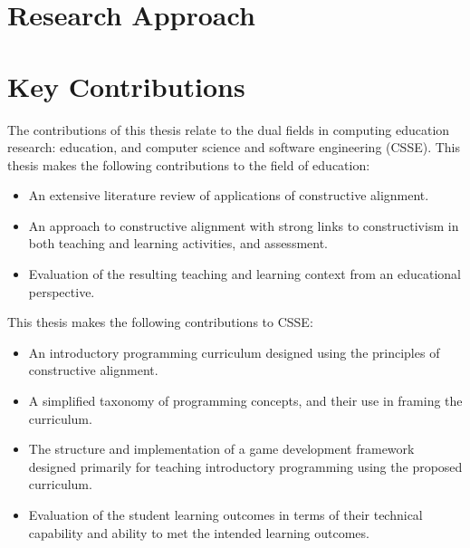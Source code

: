 

\section{Research Approach} %
\label{sec:research_approach}



\clearpage
\section{Key Contributions} %
\label{sec:key_contributions}



The contributions of this thesis relate to the dual fields in computing education research: education, and computer science and software engineering (CSSE). This thesis makes the following contributions to the field of education:
\begin{itemize}
	\item An extensive literature review of applications of constructive alignment.
	\item An approach to constructive alignment with strong links to constructivism in both teaching and learning activities, and assessment.
	\item Evaluation of the resulting teaching and learning context from an educational perspective. 
\end{itemize}

This thesis makes the following contributions to CSSE:
\begin{itemize}
	\item An introductory programming curriculum designed using the principles of constructive alignment.
	\item A simplified taxonomy of programming concepts, and their use in framing the curriculum.
	\item The structure and implementation of a game development framework designed primarily for teaching introductory programming using the proposed curriculum.
	\item Evaluation of the student learning outcomes in terms of their technical capability and ability to met the intended learning outcomes.
\end{itemize}

